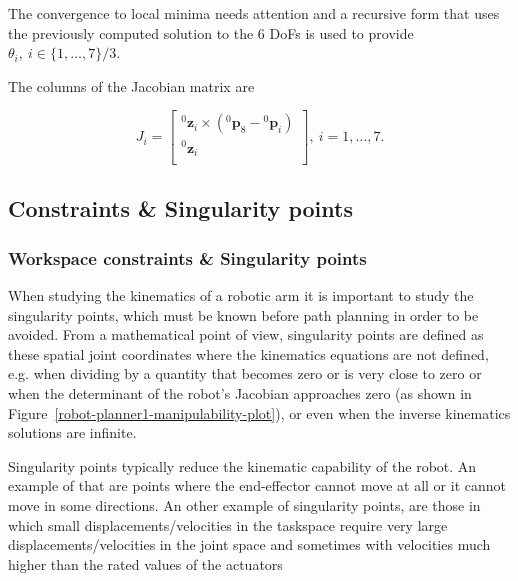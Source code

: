 The convergence to local minima needs attention and a recursive form that uses the previously computed solution to the 6 DoFs is used to provide $\theta_i,~i\in\{ 1,\ldots,7\}/3$.

The columns of the Jacobian matrix are 

\begin{equation}
J_i = \begin{bmatrix}
{}^0\mathbf{z}_i \times ({}^0\mathbf{p}_8 - {}^0\mathbf{p}_i) \\
{}^0\mathbf{z}_i \\
\end{bmatrix},~i=1,\ldots,7.
\end{equation}


\subsection{Constraints \& Singularity points}
%
\subsubsection{Workspace constraints \& Singularity points}
%
When studying the kinematics of a robotic arm it is important to study the singularity points, which must be known before path planning in order to be avoided. From a mathematical point of view, singularity points are defined as these spatial joint coordinates where the kinematics equations are not defined, e.g. when dividing by a quantity that becomes zero or is very close to zero or when the determinant of the robot's Jacobian approaches zero (as shown in Figure~\ref{robot-planner1-manipulability-plot}), or even when the inverse kinematics solutions are infinite. 

Singularity points typically reduce the kinematic capability of the robot. An example of that are points where the end-effector cannot move at all or it cannot move in some directions. An other example of singularity points, are those in which small displacements/velocities in the taskspace require very large displacements/velocities in the joint space and sometimes with velocities much higher than the rated values of the actuators


